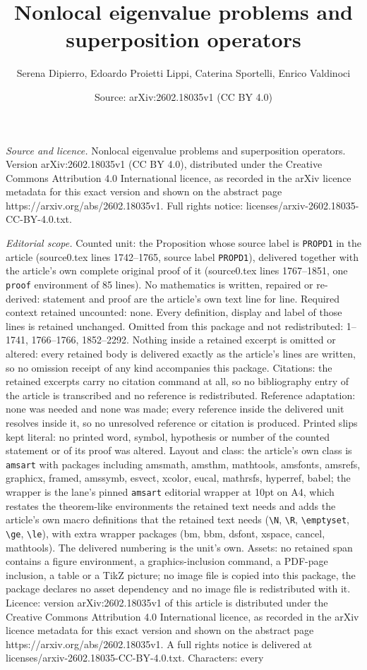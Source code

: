 \documentclass[10pt,a4paper]{amsart}
\title[Nonlocal eigenvalue problems and superposition operators]{Nonlocal eigenvalue problems and superposition operators}
\author{Serena Dipierro, Edoardo Proietti Lippi, Caterina Sportelli, Enrico Valdinoci}
\date{Source: arXiv:2602.18035v1 (CC BY 4.0)}
\begin{document}
\maketitle

\noindent\emph{Source and licence.} Nonlocal eigenvalue problems and superposition operators. Version arXiv:2602.18035v1 (CC BY 4.0), distributed under the Creative Commons Attribution 4.0 International licence, as recorded in the arXiv licence metadata for this exact version and shown on the abstract page https://arxiv.org/abs/2602.18035v1. Full rights notice: licenses/arxiv-2602.18035-CC-BY-4.0.txt.\par\smallskip

\noindent\textit{Editorial scope.} Counted unit: the Proposition whose source label is \texttt{PROPD1} in the article (source0.tex lines 1742--1765, source label \texttt{PROPD1}), delivered together with the article's own complete original proof of it (source0.tex lines 1767--1851, one \texttt{proof} environment of 85 lines). No mathematics is written, repaired or re-derived: statement and proof are the article's own text line for line. Required context retained uncounted: none. Every definition, display and label of those lines is retained unchanged. Omitted from this package and not redistributed: 1--1741, 1766--1766, 1852--2292. Nothing inside a retained excerpt is omitted or altered: every retained body is delivered exactly as the article's lines are written, so no omission receipt of any kind accompanies this package. Citations: the retained excerpts carry no citation command at all, so no bibliography entry of the article is transcribed and no reference is redistributed. Reference adaptation: none was needed and none was made; every reference inside the delivered unit resolves inside it, so no unresolved reference or citation is produced. Printed slips kept literal: no printed word, symbol, hypothesis or number of the counted statement or of its proof was altered. Layout and class: the article's own class is \texttt{amsart} with packages including amsmath, amsthm, mathtools, amsfonts, amsrefs, graphicx, framed, amssymb, esvect, xcolor, eucal, mathrsfs, hyperref, babel; the wrapper is the lane's pinned \texttt{amsart} editorial wrapper at 10pt on A4, which restates the theorem-like environments the retained text needs and adds the article's own macro definitions that the retained text needs (\texttt{\textbackslash N}, \texttt{\textbackslash R}, \texttt{\textbackslash emptyset}, \texttt{\textbackslash ge}, \texttt{\textbackslash le}), with extra wrapper packages (bm, bbm, dsfont, xspace, cancel, mathtools). The delivered numbering is the unit's own. Assets: no retained span contains a figure environment, a graphics-inclusion command, a PDF-page inclusion, a table or a TikZ picture; no image file is copied into this package, the package declares no asset dependency and no image file is redistributed with it. Licence: version arXiv:2602.18035v1 of this article is distributed under the Creative Commons Attribution 4.0 International licence, as recorded in the arXiv licence metadata for this exact version and shown on the abstract page https://arxiv.org/abs/2602.18035v1. A full rights notice is delivered at licenses/arxiv-2602.18035-CC-BY-4.0.txt. Characters: every 
\end{document}

